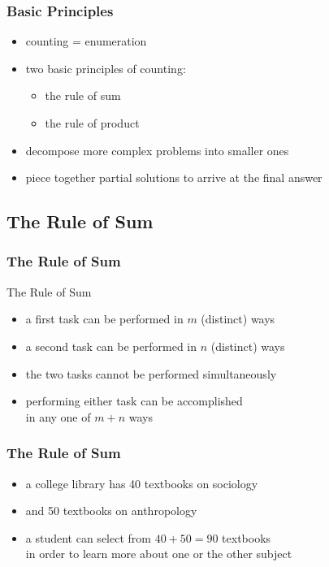 \documentclass[dvipsnames]{beamer}
\begin{document}
\begin{frame}
  \frametitle{Basic Principles}

  \begin{itemize}
    \item counting = enumeration

    \pause
    \medskip
    \item two basic principles of counting:
    \begin{itemize}
      \item the rule of sum
      \item the rule of product
    \end{itemize}

    \item decompose more complex problems into smaller ones
    \item piece together partial solutions to arrive at the final answer
  \end{itemize}
\end{frame}

\subsection{The Rule of Sum}

\begin{frame}
  \frametitle{The Rule of Sum}

  \begin{block}{The Rule of Sum}
    \begin{itemize}
      \item a first task can be performed in $m$ (distinct) ways
      \item a second task can be performed in $n$ (distinct) ways
      \item the two tasks cannot be performed simultaneously

      \medskip
      \item performing either task can be accomplished\\
    in any one of $m+n$ ways
    \end{itemize}
  \end{block}
\end{frame}

\begin{frame}
  \frametitle{The Rule of Sum}

  \begin{example}
    \begin{itemize}
      \item a college library has 40 textbooks on sociology
      \item and 50 textbooks on anthropology

      \medskip
      \item a student can select from $40 + 50 = 90$ textbooks\\
        in order to learn more about one or the other subject
    \end{itemize}
  \end{example}
\end{frame}
\end{document}
